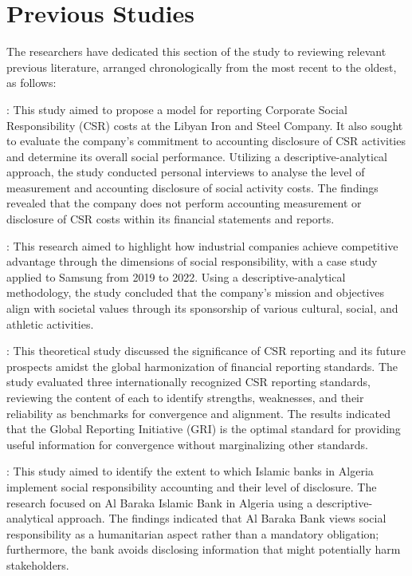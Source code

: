 \documentclass{NSP1}
\begin{document}
\section{Previous Studies}
The researchers have dedicated this section of the study to reviewing relevant previous literature, arranged chronologically from the most recent to the oldest, as follows:

\cite{ref29}: This study aimed to propose a model for reporting Corporate Social Responsibility (CSR) costs at the Libyan Iron and Steel Company. It also sought to evaluate the company's commitment to accounting disclosure of CSR activities and determine its overall social performance. Utilizing a descriptive-analytical approach, the study conducted personal interviews to analyse the level of measurement and accounting disclosure of social activity costs. The findings revealed that the company does not perform accounting measurement or disclosure of CSR costs within its financial statements and reports.

\cite{ref31}: This research aimed to highlight how industrial companies achieve competitive advantage through the dimensions of social responsibility, with a case study applied to Samsung from 2019 to 2022. Using a descriptive-analytical methodology, the study concluded that the company's mission and objectives align with societal values through its sponsorship of various cultural, social, and athletic activities.

\cite{ref28}: This theoretical study discussed the significance of CSR reporting and its future prospects amidst the global harmonization of financial reporting standards. The study evaluated three internationally recognized CSR reporting standards, reviewing the content of each to identify strengths, weaknesses, and their reliability as benchmarks for convergence and alignment. The results indicated that the Global Reporting Initiative (GRI) is the optimal standard for providing useful information for convergence without marginalizing other standards.

\cite{ref21}: This study aimed to identify the extent to which Islamic banks in Algeria implement social responsibility accounting and their level of disclosure. The research focused on Al Baraka Islamic Bank in Algeria using a descriptive-analytical approach. The findings indicated that Al Baraka Bank views social responsibility as a humanitarian aspect rather than a mandatory obligation; furthermore, the bank avoids disclosing information that might potentially harm stakeholders.
\end{document}
